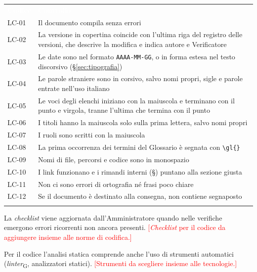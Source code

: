 \documentclass[12pt,a4paper]{article}
\newcommand{\ph}[1]{\textcolor{red}{[#1]}}
\newcommand{\gl}[1]{\emph{#1}\textsubscript{\scriptsize G}}
\newcommand{\thc}[1]{\textcolor{white}{\textbf{#1}}}
\newcommand{\rl}{\arrayrulecolor{bfline}\hline}
\begin{document}
\begin{center}
\begin{tabularx}{\linewidth}{>{\hsize=0.3\hsize\raggedright\arraybackslash}X>{\hsize=1.7\hsize\raggedright\arraybackslash}X}
\rowcolor{bfblue}\thc{Codice} & \thc{Controllo} \\
LC-01 & Il documento compila senza errori \\ \rl
LC-02 & La versione in copertina coincide con l'ultima riga del registro delle versioni, che descrive la modifica e indica autore e Verificatore \\ \rl
LC-03 & Le date sono nel formato \texttt{AAAA-MM-GG}, o in forma estesa nel testo discorsivo (§\ref{sec:tipografia}) \\ \rl
LC-04 & Le parole straniere sono in corsivo, salvo nomi propri, sigle e parole entrate nell'uso italiano \\ \rl
LC-05 & Le voci degli elenchi iniziano con la maiuscola e terminano con il punto e virgola, tranne l'ultima che termina con il punto \\ \rl
LC-06 & I titoli hanno la maiuscola solo sulla prima lettera, salvo nomi propri \\ \rl
LC-07 & I ruoli sono scritti con la maiuscola \\ \rl
LC-08 & La prima occorrenza dei termini del Glossario è segnata con \texttt{\textbackslash gl\{\}} \\ \rl
LC-09 & Nomi di file, percorsi e codice sono in monospazio \\ \rl
LC-10 & I link funzionano e i rimandi interni (§) puntano alla sezione giusta \\ \rl
LC-11 & Non ci sono errori di ortografia né frasi poco chiare \\ \rl
LC-12 & Se il documento è destinato alla consegna, non contiene segnaposto \\ \rl
\end{tabularx}
\end{center}
La \emph{checklist} viene aggiornata dall'Amministratore quando nelle verifiche emergono errori ricorrenti non ancora presenti. \ph{\emph{Checklist} per il codice da aggiungere insieme alle norme di codifica.}

Per il codice l'analisi statica comprende anche l'uso di strumenti automatici (\gl{linter}, analizzatori statici). \ph{Strumenti da scegliere insieme alle tecnologie.}
\end{document}
